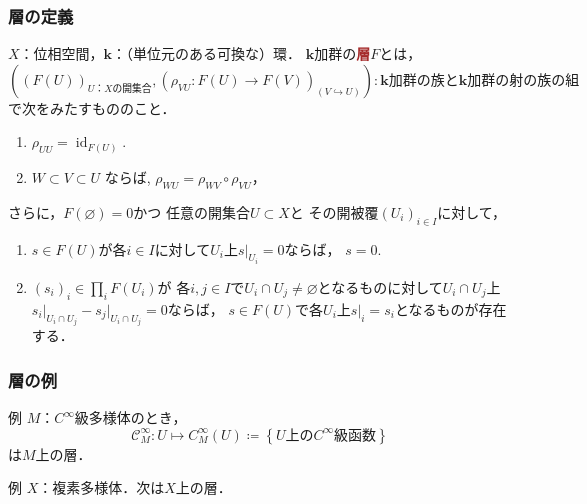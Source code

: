 \documentclass[dvipdfmx,10pt,aspectratio=169,leqno]{beamer}%
\newcommand{\kk}{\mathbf{k}}
\newcommand{\mcal}{\mathcal}
\numberwithin{equation}{subsection}
\newcommand{\id}{\mathop{\mathrm{id}}\nolimits}
\newcommand{\cC}{\mcal{C}}
\newcommand{\cD}{\mcal{D}}
\newcommand{\cM}{\mcal{M}}
\newcommand{\cO}{\mcal{O}}
\newcommand{\Sol}[2][]{\mathop{\mathcal{S}ol}\nolimits_{#1}(#2)}
\theoremstyle{mystyle}
\newcommand{\smid}{\mathrel{;}}
\begin{document}
\begin{frame}
  \frametitle{層の定義}
  \begin{definition}[層]
    \(X\)：位相空間，\(\kk\)：（単位元のある可換な）環．
    \(\kk\)加群の\textbf{\textcolor{brown}{層}}\(F\)とは，
    \[
      (
        \left(F(U)\right)_{\text{\(U\)：\(X\)の開集合}},
        \left(\rho_{VU}\colon F(U)\to F(V)\right)_{(V\hookrightarrow U)}
      )
      \colon
      \text{\(\kk\)加群の族と\(\kk\)加群の射の族の組}
    \]で次をみたすもののこと．\pause
  \begin{enumerate}
      \setlength{\leftskip}{10pt}
      \item $\rho_{UU} = \id_{F(U)}$. \pause
      \item $W \subset V \subset U$ ならば, 
      $\rho_{WU} = \rho_{WV} \circ \rho_{VU}$，\label{enum:res}
  \end{enumerate}\pause
  さらに，\(F(\varnothing)=0\)かつ
  任意の開集合\(U\subset X\)と
  その開被覆\(\left(U_i\right)_{i\in I}\)に対して，\pause
  \begin{enumerate}[S1.]
      \setlength{\leftskip}{10pt}
      \item \(s\in F(U)\)が各\(i\in I\)に対して\(U_i\)上\(s\rvert_{U_{i}}=0\)ならば，
      \(s=0\).\label{sheaf-cond1}\pause
      \item \(\left(s_i\right)_i\in\prod_{i}F(U_i)\)が
      各\(i,j\in I\)で\(U_i\cap U_j\ne\varnothing\)となるものに対して\(U_i\cap U_j\)上\(s_i\rvert_{U_i\cap U_j}-s_j\rvert_{U_i\cap U_j}=0\)ならば，
      \(s\in F(U)\)で各\(U_i\)上\(s\rvert_i=s_i\)となるものが存在する．\label{sheaf-cond2}
  \end{enumerate}
  \end{definition}
\end{frame}
\begin{frame}
    \frametitle{層の例}
\begin{exampleblock}{例}
  \(M\)：\(C^\infty\)級多様体のとき，
  \[
    \cC_{M}^{\infty}\colon U\mapsto 
    C_{M}^{\infty}(U)\coloneqq
    \left\{\text{\(U\)上の\(C^{\infty}\)級函数}\right\}
  \]は\(M\)上の層．
\end{exampleblock}\pause
\begin{exampleblock}{例}
  \(X\)：複素多様体．次は\(X\)上の層．
\end{exampleblock}
\end{frame}
\end{document}
